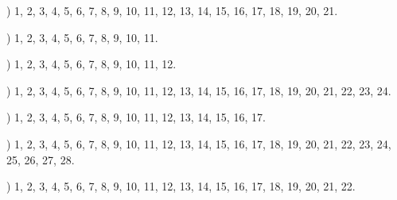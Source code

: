 \documentclass[a4paper,11pt]{article}
\begin{document}
\vspace{\spaceFour}



\noindent
{}) 1, 2, 3, 4, 5, 6, 7, 8, 9, 10, 11, 12, 13, 14, 15, 16,
17, 18, 19, 20, 21.

\vspace{\spaceFour}



\noindent
{}) 1, 2, 3, 4, 5, 6, 7, 8, 9, 10, 11.

\vspace{\spaceFour}



\noindent
{}) 1, 2, 3, 4, 5, 6, 7, 8, 9, 10, 11, 12.

\vspace{\spaceFour}



\noindent
{}) 1, 2, 3, 4, 5, 6, 7, 8, 9, 10, 11, 12, 13, 14, 15, 16,
17, 18, 19, 20, 21, 22, 23, 24.

\vspace{\spaceFour}



\noindent
{}) 1, 2, 3, 4, 5, 6, 7, 8, 9, 10, 11, 12, 13, 14, 15, 16,
17.

\vspace{\spaceFour}



\noindent
{}) 1, 2, 3, 4, 5, 6, 7, 8, 9, 10, 11, 12, 13, 14, 15, 16,
17, 18, 19, 20, 21, 22, 23, 24, 25, 26, 27, 28.

\vspace{\spaceFour}



\noindent
{}) 1, 2, 3, 4, 5, 6, 7, 8, 9, 10, 11, 12, 13, 14, 15, 16,
17, 18, 19, 20, 21, 22.


\vspace{\spaceTwo}












{}






\end{document}
